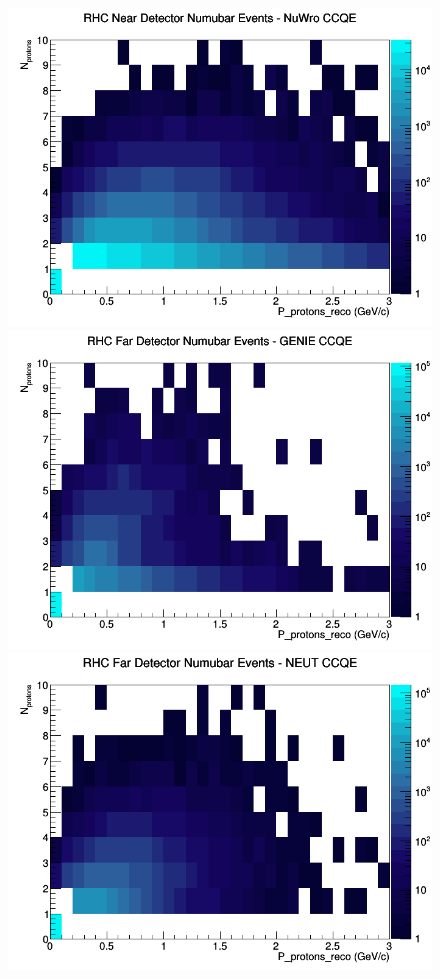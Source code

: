 \begin{figure}[h]
\includegraphics[width=\linewidth]{eff_N_P/LAr/protons/CCQE_RHC_ND_numubar_N_P_NuWro.png}
\endminipage
\newline
{}
\includegraphics[width=\linewidth]{eff_N_P/LAr/protons/CCQE_RHC_FD_numubar_N_P_GENIE.png}
\endminipage
{}
\includegraphics[width=\linewidth]{eff_N_P/LAr/protons/CCQE_RHC_FD_numubar_N_P_NEUT.png}

\end{figure}
